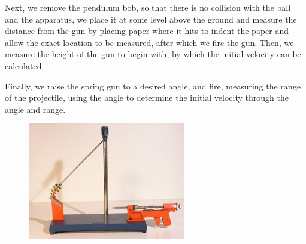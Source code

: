 \documentclass[11pt, titlepage]{article}
\begin{document}
Next, we remove the pendulum bob, so that there is no collision with the ball and the apparatus, we place it at some level above the ground and measure the distance from the gun by placing paper where it hits to indent the paper and allow the exact location to be measured, after which we fire the gun. Then, we measure the height of the gun to begin with, by which the initial velocity can be calculated.

Finally, we raise the spring gun to a desired angle, and fire, measuring the range of the projectile, using the angle to determine the initial velocity through the angle and range. 

\begin{figure}[p]
\centering
\hspace*{-10.5cm}
\includegraphics[scale=0.15, angle=270]{lab2.jpg}
\vspace*{19cm}
\end{figure}
\end{document}
